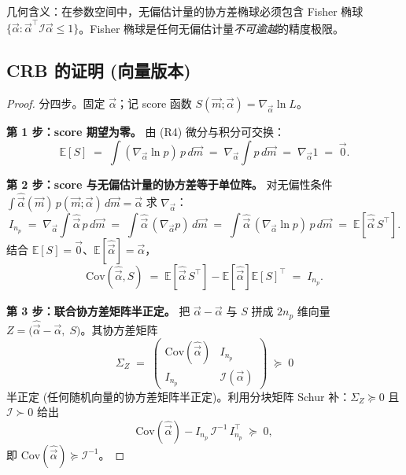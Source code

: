 几何含义：在参数空间中，无偏估计量的协方差椭球必须包含 Fisher 椭球 $\{\vec\alpha:\vec\alpha^\top\mathcal I\vec\alpha\le 1\}$。Fisher 椭球是任何无偏估计量\emph{不可逾越}的精度极限。

\subsection{CRB 的证明 (向量版本)}
\label{sec:partIa:crb:proof}

\begin{proof}
  分四步。固定 $\vec\alpha$；记 score 函数 $S(\vec m;\vec\alpha)=\nabla_{\vec\alpha}\ln L$。

  \textbf{第 1 步：score 期望为零。}
  由 (R4) 微分与积分可交换：
  \begin{equation}
    \mathbb E[S]
    \;=\; \int (\nabla_{\vec\alpha}\ln p)\,p\,d\vec m
    \;=\; \nabla_{\vec\alpha}\int p\,d\vec m
    \;=\; \nabla_{\vec\alpha}1 \;=\;\vec 0.
    \label{eq:partIa:crb:scoremean}
  \end{equation}

  \textbf{第 2 步：score 与无偏估计量的协方差等于单位阵。}
  对无偏性条件 $\int\hat{\vec\alpha}(\vec m)\,p(\vec m;\vec\alpha)\,d\vec m=\vec\alpha$ 求 $\nabla_{\vec\alpha}$：
  \begin{equation}
    I_{n_p}
    \;=\; \nabla_{\vec\alpha}\!\!\int\!\hat{\vec\alpha}\,p\,d\vec m
    \;=\; \int\!\hat{\vec\alpha}\,(\nabla_{\vec\alpha}p)\,d\vec m
    \;=\; \int\!\hat{\vec\alpha}\,(\nabla_{\vec\alpha}\ln p)\,p\,d\vec m
    \;=\; \mathbb E[\hat{\vec\alpha}\,S^\top].
    \label{eq:partIa:crb:cross}
  \end{equation}
  结合 $\mathbb E[S]=\vec 0$、$\mathbb E[\hat{\vec\alpha}]=\vec\alpha$，
  \begin{equation}
    \mathrm{Cov}(\hat{\vec\alpha},S) \;=\; \mathbb E[\hat{\vec\alpha}\,S^\top]-\mathbb E[\hat{\vec\alpha}]\mathbb E[S]^\top \;=\;I_{n_p}.
    \label{eq:partIa:crb:cov_eqI}
  \end{equation}

  \textbf{第 3 步：联合协方差矩阵半正定。}
  把 $\hat{\vec\alpha}-\vec\alpha$ 与 $S$ 拼成 $2n_p$ 维向量 $Z=\bigl(\hat{\vec\alpha}-\vec\alpha,\;S\bigr)$。其协方差矩阵
  \begin{equation}
    \Sigma_Z \;=\; \begin{pmatrix}\mathrm{Cov}(\hat{\vec\alpha}) & I_{n_p}\\ I_{n_p} & \mathcal I(\vec\alpha)\end{pmatrix}\;\succeq\;0
  \end{equation}
  半正定 (任何随机向量的协方差矩阵半正定)。利用分块矩阵 Schur 补：$\Sigma_Z\succeq 0$ 且 $\mathcal I\succ 0$ 给出
  \begin{equation}
    \mathrm{Cov}(\hat{\vec\alpha}) - I_{n_p}\,\mathcal I^{-1}\,I_{n_p}^\top \;\succeq\;0,
    \label{eq:partIa:crb:schur}
  \end{equation}
  即 $\mathrm{Cov}(\hat{\vec\alpha})\succeq\mathcal I^{-1}$。


\end{proof}
